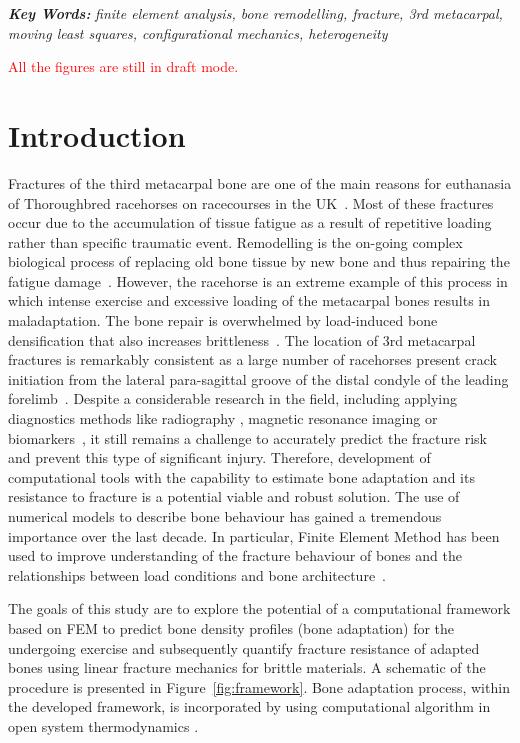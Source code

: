 \documentclass[11pt]{acmeArticle}
\numberwithin{equation}{section}
\begin{document}
{\textbf{\textit{Key Words:}} {\it finite element analysis, bone remodelling, fracture, 3rd metacarpal, moving least squares, configurational mechanics, heterogeneity}}
%
\\
\newpage
\clearpage
{}



\textcolor{red}{All the figures are still in draft mode.}
\section{Introduction}
Fractures of the third metacarpal bone are one of the main reasons for euthanasia of Thoroughbred racehorses on racecourses in the UK~\citep{Parkin2004risk}.
Most of these fractures occur due to the accumulation of tissue fatigue as a result of repetitive loading~\citep{Parkin2005} rather than specific traumatic event.
Remodelling is the on-going complex biological process of replacing old bone tissue by new bone and thus repairing the fatigue damage~\citep{hughes2017role}.
However, the racehorse is an extreme example of this process in which intense exercise and excessive loading of the metacarpal bones results in maladaptation.
The bone repair is overwhelmed by load-induced bone densification that also increases brittleness~\citep{loughridge2017qualitative}.
The location of 3rd metacarpal fractures is remarkably consistent as a large number of racehorses present crack initiation from 
the lateral para-sagittal groove of the distal condyle of the leading forelimb~\citep{jacklin2012frequency, parkin2006analysis}.
Despite a considerable research in the field, including applying diagnostics methods like radiography 
\citep{bogers2016quantitative, crijns2014intramodality, loughridge2017qualitative}, magnetic resonance imaging 
\citep{tranquille2017MRI} or biomarkers~\citep{mcilwraith2005use}, it still remains a challenge to accurately predict the fracture risk 
and prevent this type of significant injury.
Therefore, development of computational tools with the capability to estimate bone adaptation and its resistance to fracture is a potential 
viable and robust solution.
The use of numerical models to describe bone behaviour has gained a tremendous importance over the last decade. 
In particular, Finite Element Method has been used to improve understanding of the fracture behaviour of bones and the relationships between load conditions and bone architecture~\citep{podshivalov2014road, poelert2013patient}.

The goals of this study are to explore the potential of a computational framework based on FEM to predict bone density profiles 
(bone adaptation) for the undergoing exercise and subsequently quantify fracture resistance of 
adapted bones using linear fracture mechanics for brittle materials. 
A schematic of the procedure is presented in Figure~\ref{fig:framework}.
Bone adaptation process, within the developed framework, is incorporated by using computational algorithm in open system thermodynamics 
\citep{Kuhl2003a}.
\end{document}
